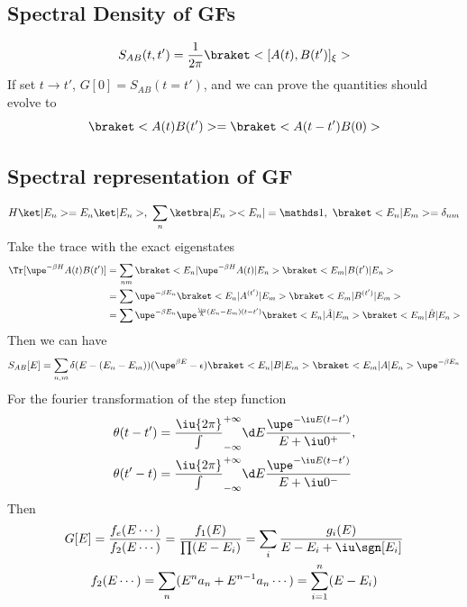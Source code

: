 \subsection{Spectral Density of GFs}

\begin{equation}
  S_{AB}(t,t') = \frac1{2\pi}\braket<[A(t), B(t')]_\xi>
\end{equation}
If set $t \to t'$, $G[0] = S_{AB}(t = t')$,
and we can prove the quantities should evolve to
\[
  \braket<A(t)B(t')> = \braket<A(t-t')B(0)>
\]

\subsection{Spectral representation of GF}

\begin{equation}
  H\ket|E_n> = E_n \ket|E_n>,~
  \sum_n \ketbra|E_n><E_n| = \identity,~
  \braket<E_n|E_m> = \delta_{nm}
\end{equation}
Take the trace with the exact eigenstates
\begin{equation}
  \begin{aligned}
    \Tr[\upe^{-\beta H} A(t) B(t')] &
  = \sum_{nm} \braket<E_n|\upe^{-\beta H} A(t)|E_n>\braket<E_m|B(t')|E_n>\\
& = \sum \upe^{-\beta E_n} \braket<E_n|A^{(t')}|E_m>\braket<E_m|B^{(t')}|E_m>\\
& = \sum \upe^{-\beta E_n} \upe^{\frac\iu\hbar (E_n-E_m)(t-t')}
    \braket<E_n|\hat A|E_m>\braket<E_m|\hat B|E_n>
  \end{aligned}
\end{equation}
Then we can have
\begin{equation}
  S_{AB}[E] = \sum_{n,m} \delta(E - (E_n - E_m)) (\upe^{\beta E} - \epsilon)
  \braket<E_n|B|E_m>\braket<E_m|A|E_n> \upe^{-\beta E_n}
\end{equation}
For the fourier transformation of the step function
\begin{align*}
  \theta(t - t') & = \frac\iu{2\pi} \int_{-\infty}^{+\infty}
  \d E \frac{\upe^{-\iu E(t-t')}}{E + \iu 0^+},\\
  \theta(t' - t) & = \frac\iu{2\pi} \int_{-\infty}^{+\infty}
  \d E \frac{\upe^{-\iu E(t-t')}}{E + \iu 0^-}
\end{align*}
Then
\begin{gather}
  G[E] = \frac{f_e(E\cdots)}{f_2(E\cdots)} = \frac{f_1(E)}{\prod(E - E_i)} = \sum_i \frac{g_i(E)}{E - E_i + \iu\sgn[E_i]}\\
  f_2(E\cdots) = \sum_n (E^na_n + E^{n-1}a_n \cdots) = \sum_{i=1}^n(E - E_i)
\end{gather}
